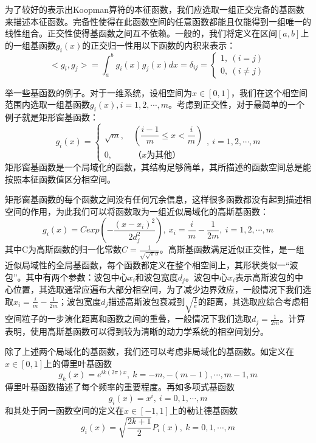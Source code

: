 为了较好的表示出Koopman算符的本征函数，我们应选取一组正交完备的基函数来描述本征函数。完备性使得在此函数空间的任意函数都能且仅能得到一组唯一的线性组合。正交性使得基函数之间互不依赖。一般的，我们将定义在区间$[a,b]$上的一组基函数${g_i(x)}$的正交归一性用以下函数的内积来表示：
\begin{equation}
    <g_i,g_j>=\int_a^b{g_i(x)g_j(x)}dx=\delta_{ij}=
    \begin{cases}
        1,\ (i=j)\\
        0,\ (i\neq j)
    \end{cases}
\end{equation}

举一些基函数的例子。对于一维系统，设相空间为$x\in [0,1]$，我们在这个相空间范围内选取一组基函数${g_i(x)},i=1,2,\cdots,m$。考虑到正交性，对于最简单的一个例子就是矩形窗基函数：
\begin{equation}
    g_i(x)=
    \begin{cases}
        \sqrt{m},\ &(\dfrac{i-1}{m}\leqslant x<\dfrac{i}{m})\\
        0,\ &（x为其他）
    \end{cases},\ i=1,2,\cdots,m
\end{equation}
矩形窗基函数是一个局域化的函数，其结构足够简单，其所描述的函数空间总是能按照本征函数值区分相空间。

矩形窗基函数的每个函数之间没有任何冗余信息，这样很多函数都没有起到描述相空间的作用，为此我们可以将函数取为一组近似局域化的高斯基函数：
\begin{equation}
    g_i(x)=Cexp\left(-\dfrac{(x-x_i)^2}{2d_j^2}\right), \ x_i=\frac{i}{m}-\frac{1}{2m},\ i=1,2,\cdots,m
\end{equation}
其中C为高斯函数的归一化常数$C=\frac{1}{\sqrt{\sqrt{\pi}\sigma}}$。高斯基函数满足近似正交性，是一组近似局域性的全局基函数，每个函数都定义在整个相空间上，其形状类似一“波包”。其中有两个参数：波包中心$x_i$和波包宽度$d_j$。波包中心$x_i$表示高斯波包的中心位置，其选取通常应遍布大部分相空间，为了减少边界效应，一般情况下我们选取$x_i=\frac{i}{m}-\frac{1}{2m}$；波包宽度$d_j$描述高斯波包衰减到$\sqrt{\frac{1}{e}}$的距离，其选取应综合考虑相空间粒子的一步演化距离和函数之间的重叠，一般情况下我们选取$d_j=\frac{1}{2m}$。计算表明，使用高斯基函数可以得到较为清晰的动力学系统的相空间划分。

除了上述两个局域化的基函数，我们还可以考虑非局域化的基函数。如定义在$x\in [0,1]$上的傅里叶基函数
\begin{equation}
    g_k(x)=e^{ik(2\pi)x},\ k=-m,-(m-1),\cdots,m-1,m
\end{equation}
傅里叶基函数描述了每个频率的重要程度。再如多项式基函数
\begin{equation}
    g_i(x)=x^i,\ i=0,1,\cdots,m
\end{equation}
和其处于同一函数空间的定义在$x\in [-1,1]$上的勒让德基函数
\begin{equation}
    g_i(x)=\sqrt{\dfrac{2k+1}{2}}P_i(x),\ k=0,1,\cdots,m
\end{equation}

